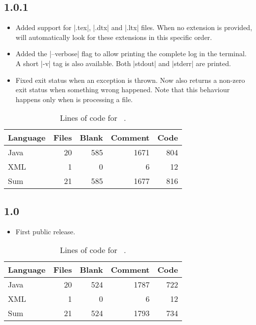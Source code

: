 \documentclass[a4paper,twoside,12pt]{memoir}
\begin{document}
\subsection*{1.0.1}

\begin{itemize}
\item[\featurenew] 
     Added support for |.tex|, |.dtx| and |.ltx| files. When no extension is 
     provided, \arara will automatically look for these extensions in this 
     specific order.
\item[\featurenew] 
     Added the |--verbose| flag to allow printing the complete log in the 
     terminal. A short |-v| tag is also available. Both |stdout| and |stderr| 
     are printed.
\item[\featurefixed] 
     Fixed exit status when an exception is thrown. Now \arara also returns a 
     non-zero exit status when something wrong happened. Note that this 
     behaviour happens only when \arara is processing a file.
\end{itemize}

{\renewcommand{\arraystretch}{1.5}
\begin{table}[ht]
\centering
\begin{tabular}{lrrrr}
\hline
\textbf{Language} & \textbf{Files} & \textbf{Blank} & \textbf{Comment} & \textbf{Code}\\
\hline
\hline
Java & 20 & 585 & 1671 & 804\\
XML & 1 & 0 & 6 & 12\\
\hline
Sum & 21 & 585 & 1677 & 816\\
\hline
\end{tabular}
\caption{Lines of code for \arara\ .}
\label{tab:locarara101}
\end{table}}

\subsection*{1.0}

\begin{itemize}
\item[\featurenew] First public release.
\end{itemize}

{\renewcommand{\arraystretch}{1.5}
\begin{table}[ht]
\centering
\begin{tabular}{lrrrr}
\hline
\textbf{Language} & \textbf{Files} & \textbf{Blank} & \textbf{Comment} & \textbf{Code}\\
\hline
\hline
Java & 20 & 524 & 1787 & 722\\
XML & 1 & 0 & 6 & 12\\
\hline
Sum & 21 & 524 & 1793 & 734\\
\hline
\end{tabular}
\caption{Lines of code for \arara\ .}
\label{tab:locarara10}
\end{table}}
\end{document}
